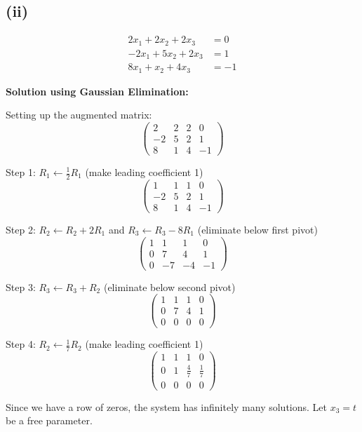 \subsection*{(ii)}
\begin{align*}
	2x_1 + 2x_2 + 2x_3  & = 0  \\
	-2x_1 + 5x_2 + 2x_3 & = 1  \\
	8x_1 + x_2 + 4x_3   & = -1
\end{align*}

\textbf{Solution using Gaussian Elimination:}

Setting up the augmented matrix:
\[
	\left(\begin{array}{ccc|c}
			2  & 2 & 2 & 0  \\
			-2 & 5 & 2 & 1  \\
			8  & 1 & 4 & -1
		\end{array}\right)
\]

Step 1: $R_1 \leftarrow \frac{1}{2}R_1$ (make leading coefficient 1)
\[
	\left(\begin{array}{ccc|c}
			1  & 1 & 1 & 0  \\
			-2 & 5 & 2 & 1  \\
			8  & 1 & 4 & -1
		\end{array}\right)
\]

Step 2: $R_2 \leftarrow R_2 + 2R_1$ and $R_3 \leftarrow R_3 - 8R_1$ (eliminate below first pivot)
\[
	\left(\begin{array}{ccc|c}
			1 & 1  & 1  & 0  \\
			0 & 7  & 4  & 1  \\
			0 & -7 & -4 & -1
		\end{array}\right)
\]

Step 3: $R_3 \leftarrow R_3 + R_2$ (eliminate below second pivot)
\[
	\left(\begin{array}{ccc|c}
			1 & 1 & 1 & 0 \\
			0 & 7 & 4 & 1 \\
			0 & 0 & 0 & 0
		\end{array}\right)
\]

Step 4: $R_2 \leftarrow \frac{1}{7}R_2$ (make leading coefficient 1)
\[
	\left(\begin{array}{ccc|c}
			1 & 1 & 1           & 0           \\
			0 & 1 & \frac{4}{7} & \frac{1}{7} \\
			0 & 0 & 0           & 0
		\end{array}\right)
\]

Since we have a row of zeros, the system has infinitely many solutions. Let $x_3 = t$ be a free parameter.

